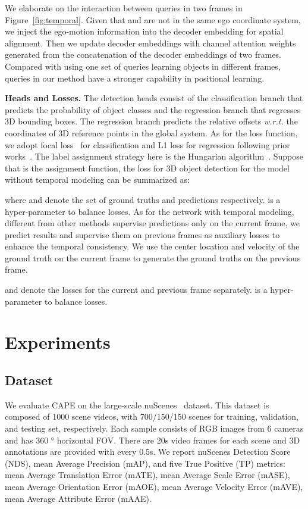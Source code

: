 \documentclass[10pt,twocolumn,letterpaper]{article}
\newcommand{\ourMethod}{CAPE}
\begin{document}
We elaborate on the interaction between queries in two frames in Figure~\ref{fig:temporal}. Given that  and  are not in the same ego coordinate system, we inject the ego-motion information into the decoder embedding  for spatial alignment. Then we update decoder embeddings with channel attention weights generated from the concatenation of the decoder embeddings of two frames. Compared with using one set of queries learning objects in different frames, queries in our method have a stronger capability in positional learning.

\noindent\textbf{Heads and Losses.} The detection heads consist of the classification branch that predicts the probability of object classes and the regression branch that regresses 3D bounding boxes. The regression branch predicts the relative offsets \textit{w.r.t.} the coordinates of 3D reference points in the global system. As for the loss function, we adopt focal loss~\cite{lin2017focal} for classification  and L1 loss for regression  following prior works~\cite{wang2022detr3d,liu2022petr}. The label assignment strategy here is the Hungarian algorithm~\cite{kuhn1955hungarian}. Suppose that  is the assignment function, the loss for 3D object detection for the model without temporal modeling can be summarized as:

where  and  denote the set of ground truths and predictions respectively.  is a hyper-parameter to balance losses.
As for the network with temporal modeling, different from other methods supervise predictions only on the current frame, we predict results and supervise them on previous frames as auxiliary losses to enhance the temporal consistency. We use the center location and velocity of the ground truth on the current frame to generate the ground truths on the previous frame.

 and  denote the losses for the current and previous frame separately.  is a hyper-parameter to balance losses.
 \section{Experiments}
\subsection{Dataset}
We evaluate \ourMethod{} on the large-scale  nuScenes~\cite{caesar2020nuscenes} dataset. This dataset is composed of 1000 scene videos, with 700/150/150 scenes for training, validation, and testing set, respectively. Each sample consists of RGB images from 6 cameras and has 360 ° horizontal FOV. There are 20s video frames for each scene and 3D annotations are provided with every 0.5s. We report nuScenes Detection Score (NDS), mean Average Precision (mAP), and five True Positive (TP) metrics: mean Average Translation Error (mATE), mean Average Scale Error (mASE), mean Average Orientation Error (mAOE), mean Average Velocity Error (mAVE), mean Average Attribute Error (mAAE).
\end{document}

